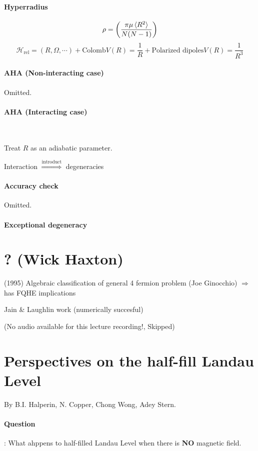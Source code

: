 \documentclass{article}
\numberwithin{equation}{subsection} %
\theoremstyle{definition}
\begin{document}
\paragraph{Hyperradius}
$$\rho = \left( \frac{\pi\mu\braket{R^2}}{N(N-1)} \right)$$
$$\mathscr{H}_\text{rel} = (R, \Omega, \cdots)
    +\text{Colomb} V(R)=\frac{1}{R}
    +\text{Polarized dipoles}V(R)=\frac{1}{R^3}
$$
\paragraph{AHA (Non-interacting case)} Omitted.
\paragraph{AHA (Interacting case)}$ $

Treat $R$ as an adiabatic parameter. 

Interaction $\overset{\text{introduct}}{\Rightarrow}$ degeneracies
\paragraph{Accuracy check} Omitted.
\paragraph{Exceptional degeneracy}

\section{? (Wick Haxton)}
\label{sec:Wick-Haxton}

(1995) Algebraic classification of general 4 fermion problem (Joe
Ginocchio) $\Rightarrow$ has FQHE implications

Jain \& Laughlin work (numerically succesful)

(No audio available for this lecture recording!, Skipped)

\section{Perspectives on the half-fill Landau Level}
\label{sec:Perspectives-on-the-half-fill-Landau-Level}

By B.I. Halperin, N. Copper, Chong Wong, Adey Stern.

\paragraph{Question}: What ahppens to half-filled Landau Level when there
is \textbf{NO} magnetic field.
\end{document}
